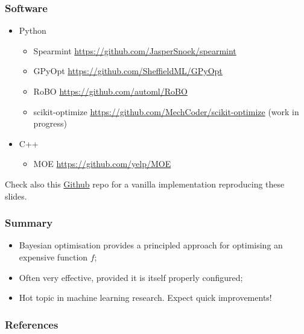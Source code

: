 \documentclass{beamer}
\begin{document}
\begin{frame}
    \frametitle{Software}

    \begin{itemize}
        \item Python
        \begin{itemize}\scriptsize
            \item Spearmint \url{https://github.com/JasperSnoek/spearmint}
            \item GPyOpt \url{https://github.com/SheffieldML/GPyOpt}
            \item RoBO \url{https://github.com/automl/RoBO}
            \item scikit-optimize \url{https://github.com/MechCoder/scikit-optimize} (work in progress)
        \end{itemize}

        \item C++
        \begin{itemize}\scriptsize
            \item MOE \url{https://github.com/yelp/MOE}
        \end{itemize}
    \end{itemize}

    \vspace{1em}

    \begin{center}
        Check also this \href{https://github.com/glouppe/talk-bayesian-optimisation}{Github} repo for a vanilla implementation reproducing these slides.
    \end{center}

\end{frame}

\begin{frame}
    \frametitle{Summary}

    \begin{itemize}
        \item Bayesian optimisation provides a principled approach for optimising an expensive function $f$;

        \vspace{1em}

        \item Often very effective, provided it is itself properly configured;

        \vspace{1em}

        \item Hot topic in machine learning research. Expect quick improvements!

    \end{itemize}

\end{frame}

\begin{frame}
    \frametitle{References}
    \nocite{brochu2010tutorial}
    \nocite{shahriari2016taking}
    {\footnotesize
    
    }
\end{frame}
\end{document}
